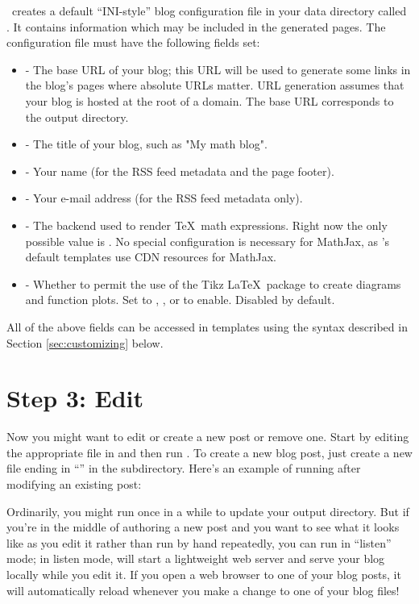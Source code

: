 \documentclass[11pt, letterpaper, oneside, titlepage]{book}
\begin{document}
\mathblog\ creates a default ``INI-style'' blog configuration file in
your data directory called .  It contains information
which may be included in the generated pages.  The configuration file
must have the following fields set:

\begin{itemize}
\item{ - The base URL of your blog; this URL will be used
  to generate some links in the blog's pages where absolute URLs
  matter.  URL generation assumes that your blog is hosted at the root
  of a domain.  The base URL corresponds to the output directory.}
\item{ - The title of your blog, such as "My math blog".}
\item{ - Your name (for the RSS feed metadata and the
  page footer).}
\item{ - Your e-mail address (for the RSS feed
  metadata only).}
\item{ - The backend used to render \TeX\ math
  expressions.  Right now the only possible value is .  No
  special configuration is necessary for MathJax, as \mathblog's
  default templates use CDN resources for MathJax.}
\item{ - Whether to permit the use of the Tikz
  \LaTeX\ package to create diagrams and function plots.  Set to
  , , or  to enable.  Disabled by default.}
\end{itemize}

All of the above fields can be accessed in templates using the syntax
described in Section \ref{sec:customizing} below.

\section{Step 3: Edit}

Now you might want to edit or create a new post or remove one.  Start
by editing the appropriate file in  and then run .
To create a new blog post, just create a new file ending in
``'' in the  subdirectory.  Here's an example of
running  after modifying an existing post:


Ordinarily, you might run  once in a while to update your
output directory.  But if you're in the middle of authoring a new post
and you want to see what it looks like as you edit it rather than run
 by hand repeatedly, you can run  in ``listen'' mode; in
listen mode,  will start a lightweight web server and serve
your blog locally while you edit it.  If you open a web browser to one
of your blog posts, it will automatically reload whenever you make a
change to one of your blog files!
\end{document}
